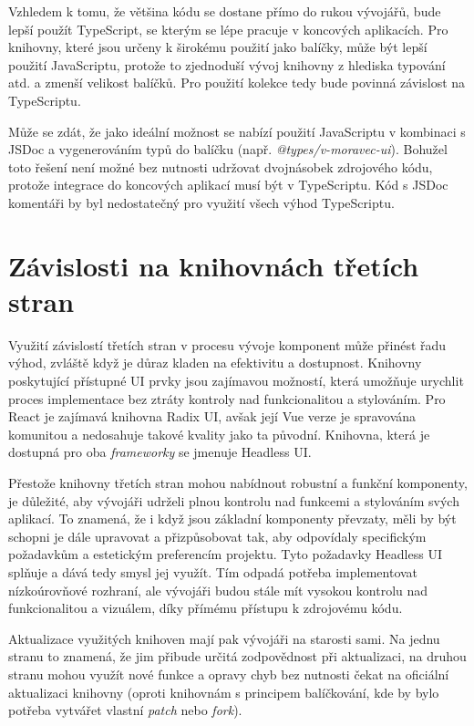 Vzhledem k tomu, že většina kódu se dostane přímo do rukou vývojářů, bude lepší použít TypeScript, se kterým se lépe pracuje v koncových aplikacích. Pro knihovny, které jsou určeny k širokému použití jako balíčky, může být lepší použití JavaScriptu, protože to zjednoduší vývoj knihovny z hlediska typování atd. a zmenší velikost balíčků. Pro použití kolekce tedy bude povinná závislost na TypeScriptu.

Může se zdát, že jako ideální možnost se nabízí použití JavaScriptu v kombinaci s JSDoc a vygenerováním typů do balíčku (např. \emph{@types/v-moravec-ui}). Bohužel toto řešení není možné bez nutnosti udržovat dvojnásobek zdrojového kódu, protože integrace do koncových aplikací musí být v TypeScriptu. Kód s JSDoc komentáři by byl nedostatečný pro využití všech výhod TypeScriptu.

\section{Závislosti na knihovnách třetích stran}
Využití závislostí třetích stran v procesu vývoje komponent může přinést řadu výhod, zvláště když je důraz kladen na efektivitu a dostupnost. Knihovny poskytující přístupné UI prvky jsou zajímavou možností, která umožňuje urychlit proces implementace bez ztráty kontroly nad funkcionalitou a stylováním. Pro React je zajímavá knihovna Radix UI, avšak její Vue verze je spravována komunitou a nedosahuje takové kvality jako ta původní. Knihovna, která je dostupná pro oba \emph{frameworky} se jmenuje Headless UI.

Přestože knihovny třetích stran mohou nabídnout robustní a funkční komponenty, je důležité, aby vývojáři udrželi plnou kontrolu nad funkcemi a stylováním svých aplikací. To znamená, že i když jsou základní komponenty převzaty, měli by být schopni je dále upravovat a přizpůsobovat tak, aby odpovídaly specifickým požadavkům a estetickým preferencím projektu. Tyto požadavky Headless UI splňuje a dává tedy smysl jej využít. Tím odpadá potřeba implementovat nízkoúrovňové rozhraní, ale vývojáři budou stále mít vysokou kontrolu nad funkcionalitou a vizuálem, díky přímému přístupu k zdrojovému kódu.

Aktualizace využitých knihoven mají pak vývojáři na starosti sami. Na jednu stranu to znamená, že jim přibude určitá zodpovědnost při aktualizaci, na druhou stranu mohou využít nové funkce a opravy chyb bez nutnosti čekat na oficiální aktualizaci knihovny (oproti knihovnám s principem balíčkování, kde by bylo potřeba vytvářet vlastní \emph{patch} nebo \emph{fork}).

